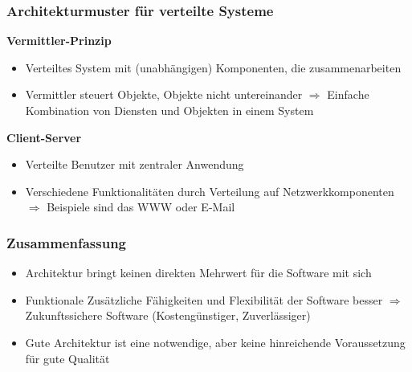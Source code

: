 \documentclass[a4paper,10pt]{scrartcl}
\begin{document}
\subsubsection{Architekturmuster für verteilte Systeme}
\textbf{Vermittler-Prinzip}

\begin{itemize}
    \item Verteiltes System mit (unabhängigen) Komponenten, die zusammenarbeiten 
    \item Vermittler steuert Objekte, Objekte nicht untereinander\newline
    $\Rightarrow$ Einfache Kombination von Diensten und Objekten in einem System
\end{itemize}
\textbf{Client-Server}
\begin{itemize}
    \item Verteilte Benutzer mit zentraler Anwendung 
    \item Verschiedene Funktionalitäten durch Verteilung auf Netzwerkkomponenten\newline
    $\Rightarrow$ Beispiele sind das WWW oder E-Mail 
\end{itemize}
\subsubsection{Zusammenfassung}
\begin{itemize}
    \item Architektur bringt keinen direkten Mehrwert für die Software mit sich
    \item Funktionale Zusätzliche Fähigkeiten und Flexibilität der Software besser\newline
    $\Rightarrow$ Zukunftssichere Software (Kostengünstiger, Zuverlässiger)
    \item Gute Architektur ist eine notwendige, aber keine hinreichende Voraussetzung für gute Qualität
\end{itemize}
\end{document}
